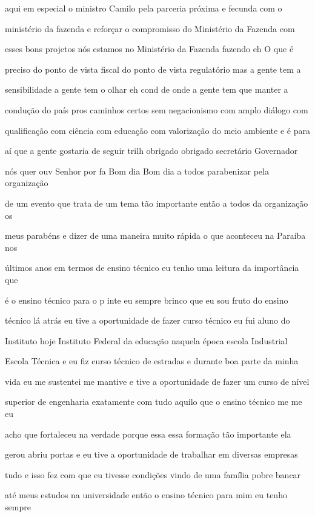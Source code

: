 \documentclass[a4paper,12pt]{article}
\begin{document}
aqui em especial o ministro Camilo pela parceria próxima e fecunda com o

ministério da fazenda e reforçar o compromisso do Ministério da Fazenda com

esses bons projetos nós estamos no Ministério da Fazenda fazendo eh O que é

preciso do ponto de vista fiscal do ponto de vista regulatório mas a gente tem a

sensibilidade a gente tem o olhar eh cond de onde a gente tem que manter a

condução do país pros caminhos certos sem negacionismo com amplo diálogo com

qualificação com ciência com educação com valorização do meio ambiente e é para

aí que a gente gostaria de seguir trilh obrigado obrigado secretário Governador

nós quer ouv Senhor por fa Bom dia Bom dia a todos parabenizar pela organização

de um evento que trata de um tema tão importante então a todos da organização os

meus parabéns e dizer de uma maneira muito rápida o que aconteceu na Paraíba nos

últimos anos em termos de ensino técnico eu tenho uma leitura da importância que

é o ensino técnico para o p inte eu sempre brinco que eu sou fruto do ensino

técnico lá atrás eu tive a oportunidade de fazer curso técnico eu fui aluno do

Instituto hoje Instituto Federal da educação naquela época escola Industrial

Escola Técnica e eu fiz curso técnico de estradas e durante boa parte da minha

vida eu me sustentei me mantive e tive a oportunidade de fazer um curso de nível

superior de engenharia exatamente com tudo aquilo que o ensino técnico me me eu

acho que fortaleceu na verdade porque essa essa formação tão importante ela

gerou abriu portas e eu tive a oportunidade de trabalhar em diversas empresas

tudo e isso fez com que eu tivesse condições vindo de uma família pobre bancar

até meus estudos na universidade então o ensino técnico para mim eu tenho sempre
\end{document}
